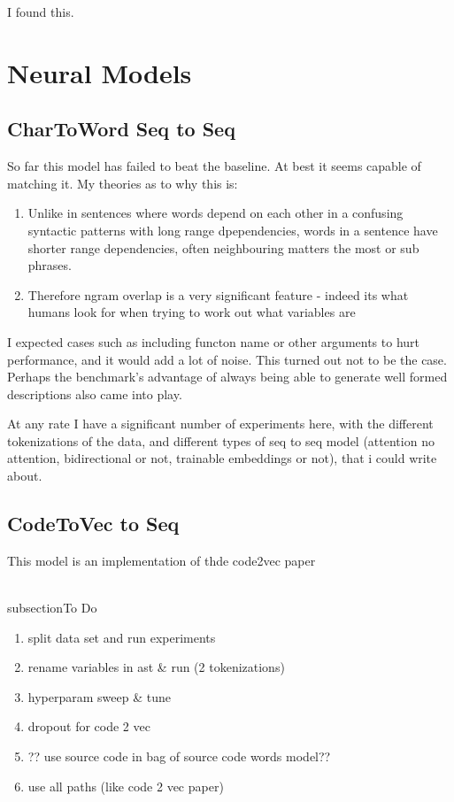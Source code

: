I found this.



\section{Neural Models} %
\label{sec:neural_models}

\subsection{CharToWord Seq to Seq} %
\label{sub:chartoword_seq_to_seq}

So far this model has failed to beat the baseline. At best it seems capable of matching it. My theories as to why this is:
 \begin{enumerate}
     \item Unlike in sentences where words depend on each other in a confusing syntactic patterns with long range dpependencies, words in a sentence have shorter range dependencies, often neighbouring matters the most or sub phrases.
     \item Therefore ngram overlap is a very significant feature - indeed its what humans look for when trying to work out what variables are
 \end{enumerate}

 I expected cases such as including functon name or other arguments to hurt performance, and it would add a lot of noise. This turned out not to be the case. Perhaps the benchmark's advantage of always being able to generate well formed descriptions also came into play.

 At any rate I have a significant number of experiments here, with the different tokenizations of the data, and different types of seq to seq model (attention no attention, bidirectional or not, trainable embeddings or not), that i could write about.

 \subsection{CodeToVec to Seq} %
 \label{sub:codetovec}

 This model is an implementation of thde code2vec paper 


 \\subsection{To Do} %
 \label{sub:to_do}
 
 \begin{enumerate}
   \item split data set and run experiments
   \item rename variables in ast & run (2 tokenizations)
   \item hyperparam sweep & tune
   \item dropout for code 2 vec
   \item ?? use source code in bag of source code words model??
   \item use all paths (like code 2 vec paper)
 \end{enumerate}
 







